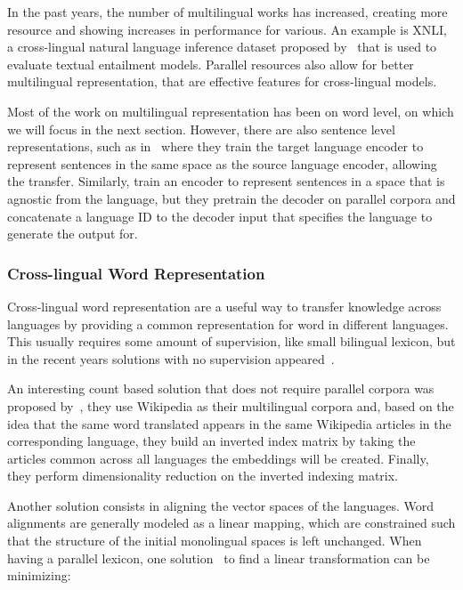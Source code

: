In the past years, the number of multilingual works has increased, creating more resource and showing increases in performance for various. An example is XNLI, a cross-lingual natural language inference dataset proposed by~\cite{conneau2018xnli} that is used to evaluate textual entailment models. Parallel resources also allow for better multilingual representation, that are effective features for cross-lingual models.

\newpage

Most of the work on multilingual representation has been on word level, on which we will focus in the next section. However, there are also sentence level representations, such as in~\citep{conneau2018xnli} where they train the target language encoder to represent sentences in the same space as the source language encoder, allowing the transfer. Similarly, \cite{atetxe2018massively} train an encoder to represent sentences in a space that is agnostic from the language, but they pretrain the decoder on parallel corpora and concatenate a language ID to the decoder input that specifies the language to generate the output for.

\subsubsection{Cross-lingual Word Representation}

Cross-lingual word representation are a useful way to transfer knowledge across languages by providing a common representation for word in different languages. This usually requires some amount of supervision, like small bilingual lexicon, but in the recent years solutions with no supervision appeared~\citep{lample2018translation}.

An interesting count based solution that does not require parallel corpora was proposed by~\cite{sogaard2015inverted}, they use Wikipedia as their multilingual corpora and, based on the idea that the same word translated appears in the same Wikipedia articles in the corresponding language, they build an inverted index matrix by taking the articles common across all languages the embeddings will be created. Finally, they perform dimensionality reduction on the inverted indexing matrix.

Another solution consists in aligning the vector spaces of the languages. Word alignments are generally modeled as a linear mapping, which are constrained such that the structure of the initial monolingual spaces is left unchanged. When having a parallel lexicon, one solution~\citep{mikolov2013exploiting} to find a linear transformation can be minimizing:

